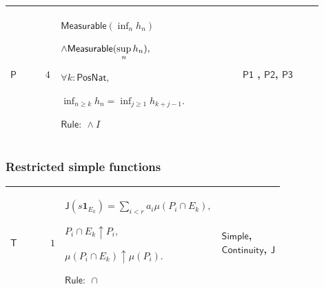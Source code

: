 \documentclass[12pt,reqno]{amsart}
\theoremstyle{blueplain}
\numberwithin{equation}{section}
\newlength{\DCTOneColumnBody}
\begin{document}
{\scriptsize \setlength{\parskip}{0pt}\nointerlineskip
\noindent 
\begin{tabular}{|@{}>{\centering\arraybackslash}m{0.10658\linewidth}|>{\centering\arraybackslash}m{0.03553\linewidth}|>{\centering\arraybackslash}m{0.52105\linewidth}|>{\centering\arraybackslash}m{0.23684\linewidth}|}
\hline
\hypertarget{proof:P4}{$\displaystyle \mathsf{P}$} & $\displaystyle 4$ & $%
\displaystyle \mathsf{Measurable}(\inf_nh_n)$\par$\displaystyle \land\mathsf{%
Measurable}(\sup_nh_n),$\par$\displaystyle \forall k:\mathsf{PosNat},$\par$%
\displaystyle \inf_{n\ge k}h_n=\inf_{j\ge1}h_{k+j-1}.$\par$\displaystyle 
\mathsf{Rule}:\ \land I$ & \hyperlink{proof:P1}{$\displaystyle \mathsf{P1}$}%
, \hyperlink{proof:P2}{$\displaystyle \mathsf{P2}$}, \hyperlink{proof:P3}{$%
\displaystyle \mathsf{P3}$} \\ \hline
\end{tabular}%
}

\subsubsection{\protect\scriptsize Restricted simple functions}

{\scriptsize \setlength{\parskip}{0pt}\nointerlineskip
\noindent 
\begin{tabular}{|@{}>{\centering\arraybackslash}m{\DCTOneColumnBody}|}
\hline
$\displaystyle \mathsf{Context\_T}:=$\par$\displaystyle s:\mathsf{S}_A,\quad%
\mathsf{Rep}(s;r,a,P),$\par$\displaystyle (\forall k,\ E_k\in A)\land
E_k\uparrow X.$ \\ \hline
\end{tabular}%
}

{\scriptsize \setlength{\parskip}{0pt}\nointerlineskip
\noindent 
\begin{tabular}{|@{}>{\centering\arraybackslash}m{0.10658\linewidth}|>{\centering\arraybackslash}m{0.03553\linewidth}|>{\centering\arraybackslash}m{0.52105\linewidth}|>{\centering\arraybackslash}m{0.23684\linewidth}|}
\hline
\hypertarget{proof:T1}{$\displaystyle \mathsf{T}$} & $\displaystyle 1$ & $%
\displaystyle \mathsf{J}(s\mathbf{1}_{E_k})=\sum_{i<r}a_i\mu(P_i\cap E_k),$%
\par$\displaystyle P_i\cap E_k\uparrow P_i,$\par$\displaystyle \mu(P_i\cap
E_k)\uparrow\mu(P_i).$\par$\displaystyle \mathsf{Rule}:\ \cap$ & \hyperlink{lem:Simple}%
{$\displaystyle \mathsf{Simple}$}, \hyperlink{lem:Continuity}{$\displaystyle 
\mathsf{Continuity}$}, \hyperlink{def:J}{$\displaystyle \mathsf{J}$} \\ 
\hline
\end{tabular}%
}
\end{document}

